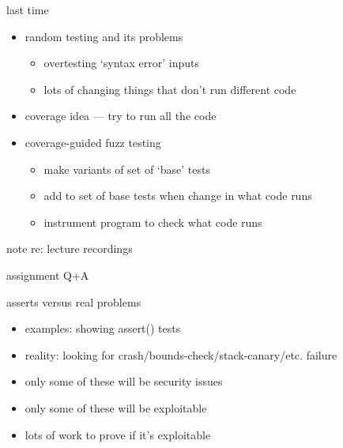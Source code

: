 \date{}
\title{}
\date{}
\usepackage[outputdir=latex.out]{minted}

\begin{frame}
    \titlepage
\end{frame}


\begin{frame}{last time}
    \begin{itemize}
    \item random testing and its problems
        \begin{itemize}
        \item overtesting `syntax error' inputs
        \item lots of changing things that don't run different code
        \end{itemize}
    \item coverage idea --- try to run all the code
    \item coverage-guided fuzz testing
        \begin{itemize}
        \item make variants of set of `base' tests
        \item add to set of base tests when change in what code runs
        \item instrument program to check what code runs
        \end{itemize}
    \end{itemize}
\end{frame}

\begin{frame}{note re: lecture recordings}
\end{frame}

\begin{frame}{assignment Q+A}
\end{frame}



\begin{frame}{asserts versus real problems}
    \begin{itemize}
    \item examples: showing assert() tests
    \vspace{.5cm}
    \item reality: looking for crash/bounds-check/stack-canary/etc. failure
    \item only some of these will be security issues
    \item only some of these will be exploitable
    \item lots of work to prove if it's exploitable
    \end{itemize}
\end{frame}

